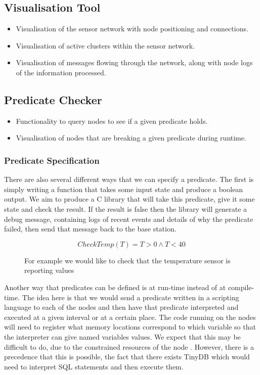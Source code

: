 \documentclass[a4paper]{article}
\begin{document}
\subsection{Visualisation Tool}
\begin{itemize}
	\item Visualisation of the sensor network with node positioning and connections.
	\item Visualisation of active clusters within the sensor network.
	\item Visualisation of messages flowing through the network, along with node logs of the information processed.
\end{itemize}

\subsection{Predicate Checker}
\begin{itemize}
	\item Functionality to query nodes to see if a given predicate holds.
	\item Visualisation of nodes that are breaking a given predicate during runtime.
\end{itemize}

\subsubsection{Predicate Specification}

There are also several different ways that we can specify a predicate. The first is simply writing a function that takes some input state and produce a boolean output. We aim to produce a C library that will take this predicate, give it some state and check the result. If the result is false then the library will generate a debug message, containing logs of recent events and details of why the predicate failed, then send that message back to the base station.

\begin{figure}[H]
\begin{center}
    \begin{displaymath}
	CheckTemp(T) = T > 0 \land T < 40
	\end{displaymath}
	\caption{For example we would like to check that the temperature sensor is reporting values}
\end{center}
\end{figure}

Another way that predicates can be defined is at run-time instead of at compile-time. The idea here is that we would send a predicate written in a scripting language to each of the nodes and then have that predicate interpreted and executed at a given interval or at a certain place. The code running on the nodes will need to register what memory locations correspond to which variable so that the interpreter can give named variables values. We expect that this may be difficult to do, due to the constrained resources of the node \cite{CM5000}. However, there is a precedence that this is possible, the fact that there exists TinyDB \cite{?} which would need to interpret SQL statements and then execute them.
\end{document}
